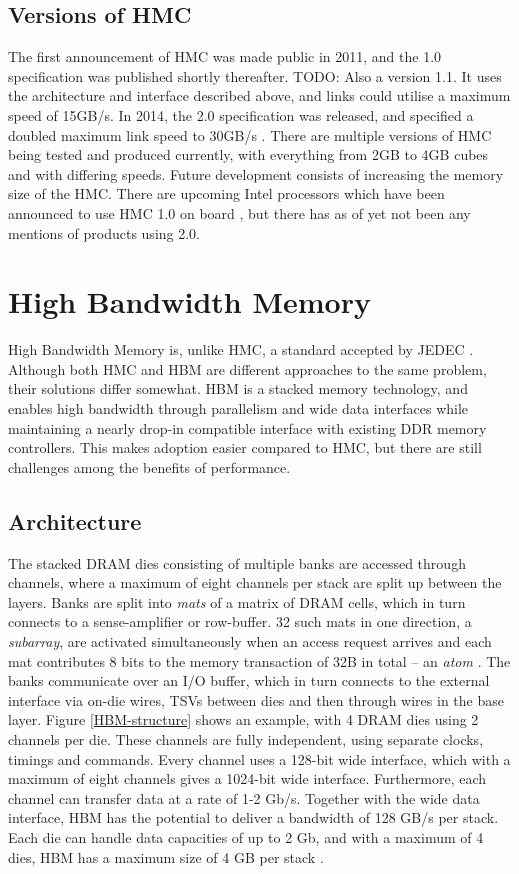 \subsection{Versions of HMC}
The first announcement of HMC was made public in 2011, and the 1.0 specification was published shortly thereafter. TODO: Also a version 1.1. It uses the architecture and interface described above, and links could utilise a maximum speed of 15GB/s. In 2014, the 2.0 specification was released, and specified a doubled maximum link speed to 30GB/s \cite{hybrid2014hybrid}. There are multiple versions of HMC being tested and produced currently, with everything from 2GB to 4GB cubes and with differing speeds. Future development consists of increasing the memory size of the HMC. There are upcoming Intel processors which have been announced to use HMC 1.0 on board \cite{micron2014ikl}, but there has as of yet not been any mentions of products using 2.0. 


\section{High Bandwidth Memory}
High Bandwidth Memory is, unlike HMC, a standard accepted by JEDEC \cite{standard2013high}. Although both HMC and HBM are different approaches to the same problem, their solutions differ somewhat. HBM is a stacked memory technology, and enables high bandwidth through parallelism and wide data interfaces while maintaining a nearly drop-in compatible interface with existing DDR memory controllers. This makes adoption easier compared to HMC, but there are still challenges among the benefits of performance.

\subsection{Architecture}
The stacked DRAM dies consisting of multiple banks are accessed through channels, where a maximum of eight channels per stack are split up between the layers. Banks are split into \emph{mats} of a matrix of DRAM cells, which in turn connects to a sense-amplifier or row-buffer. 32 such mats in one direction, a \emph{subarray}, are activated simultaneously when an access request arrives and each mat contributes 8 bits to the memory transaction of 32B in total -- an \emph{atom} \cite{7920815}. The banks communicate over an I/O buffer, which in turn connects to the external interface via on-die wires, TSVs between dies and then through wires in the base layer. Figure \ref{HBM-structure} shows an example, with 4 DRAM dies using 2 channels per die. These channels are fully independent, using separate clocks, timings and commands. Every channel uses a 128-bit wide interface, which with a maximum of eight channels gives a 1024-bit wide interface. Furthermore, each channel can transfer data at a rate of 1-2 Gb/s. Together with the wide data interface, HBM has the potential to deliver a bandwidth of 128 GB/s per stack. Each die can handle data capacities of up to 2 Gb, and with a maximum of 4 dies, HBM has a maximum size of 4 GB per stack \cite{7478812}.
\bigskip

